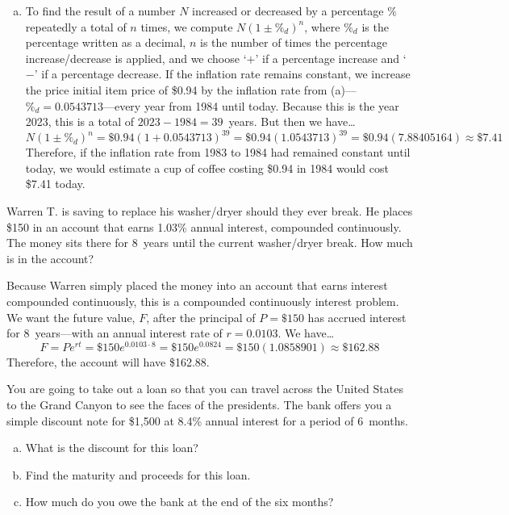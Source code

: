 \documentclass[12pt,letterpaper]{exam}
\begin{document}
\begin{questions}
\begin{enumerate}[(a)]
\item To find the result of a number $N$ increased or decreased by a percentage $\%$ repeatedly a total of $n$ times, we compute $N(1 \pm \%_d)^n$, where $\%_d$ is the percentage written as a decimal, $n$ is the number of times the percentage increase/decrease is applied, and we choose `$+$' if a percentage increase and `$-$' if a percentage decrease. If the inflation rate remains constant, we increase the price initial item price of \$0.94 by the inflation rate from (a)---$\%_d= 0.0543713$---every year from 1984 until today. Because this is the year 2023, this is a total of $2023 - 1984= 39$~years. But then we have\dots
	\[
	N(1 \pm \%_d)^n= \$0.94(1 + 0.0543713)^{39}= \$0.94(1.0543713)^{39}= \$0.94(7.88405164) \approx \$7.41
	\]
Therefore, if the inflation rate from 1983 to 1984 had remained constant until today, we would estimate a cup of coffee costing \$0.94 in 1984 would cost \$7.41 today. 
\end{enumerate}
	
	

\newpage
\question[10] Warren T. is saving to replace his washer/dryer should they ever break. He places \$150 in an account that earns 1.03\% annual interest, compounded continuously. The money sits there for 8~years until the current washer/dryer break. How much is in the account? \pspace

\sol Because Warren simply placed the money into an account that earns interest compounded continuously, this is a compounded continuously interest problem. We want the future value, $F$, after the principal of $P= \$150$ has accrued interest for 8~years---with an annual interest rate of $r= 0.0103$. We have\dots
	\[
	F= Pe^{rt}= \$150 e^{0.0103 \cdot 8}= \$150 e^{0.0824}= \$150(1.0858901) \approx \$162.88
	\]
Therefore, the account will have \$162.88. 



\newpage
\question[10] You are going to take out a loan so that you can travel across the United States to the Grand Canyon to see the faces of the presidents. The bank offers you a simple discount note for \$1,500 at 8.4\% annual interest for a period of 6~months. 
	\begin{enumerate}[(a)]
	\item What is the discount for this loan?
	\item Find the maturity and proceeds for this loan. 
	\item How much do you owe the bank at the end of the six months?
	\end{enumerate} \pspace


\end{questions}
\end{document}
